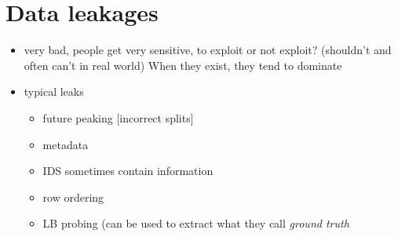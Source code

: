 \documentclass[a4paper]{report}
\begin{document}
\section{Data leakages}
\begin{itemize}
  \item very bad, people get very sensitive, to exploit or not exploit? (shouldn't and often can't in real world)
    \subitem When they exist, they tend to dominate
  \item typical leaks
    \begin{itemize}
      \item future peaking [incorrect splits]
      \item metadata
      \item IDS sometimes contain information
      \item row ordering
      \item LB probing (can be used to extract what they call \emph{ground truth}
    \end{itemize}
\end{itemize}
\end{document}
